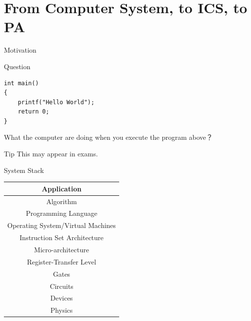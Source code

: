 \documentclass{beamer}
\begin{document}
\section{From Computer System, to ICS, to PA}

\begin{frame}
\end{frame}

\begin{frame}[fragile]{Motivation}
\begin{exampleblock}{Question}
\begin{verbatim}
int main()
{
    printf("Hello World");
    return 0;
}
\end{verbatim}
What the computer are doing when you execute the program above？
\end{exampleblock}

\begin{alertblock}{Tip}
	This may appear in exams.
\end{alertblock}

\end{frame}




\begin{frame}{System Stack}
\begin{table}
	\centering
	\begin{tabular}{|c|}
		\hline
		Application \\	
		\hline
		Algorithm\\
		\hline
		Programming Language\\
		\hline
		Operating System/Virtual Machines\\
		\hline
		\alert{Instruction Set Architecture}		\\
		\hline
		Micro-architecture\\
		\hline
		Register-Transfer Level\\
		\hline
		Gates\\
		\hline
		Circuits\\
		\hline
		Devices\\
		\hline
		Physics\\
		\hline
	\end{tabular}
\end{table}
\end{frame}
\end{document}
